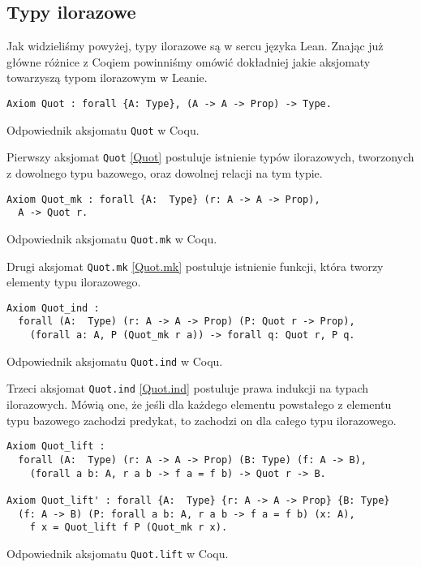 \subsection{Typy ilorazowe}
Jak widzieliśmy powyżej, typy ilorazowe są w sercu języka Lean. Znając już główne różnice z Coqiem powinniśmy omówić dokładniej jakie aksjomaty towarzyszą typom ilorazowym w Leanie. 
\begin{code}
\begin{verbatim}
Axiom Quot : forall {A: Type}, (A -> A -> Prop) -> Type.
\end{verbatim}
\caption{Odpowiednik aksjomatu \texttt{Quot} w Coqu.}
\label{Quot}
\end{code}

Pierwszy aksjomat \texttt{Quot} \ref{Quot} postuluje istnienie typów ilorazowych, tworzonych z dowolnego typu bazowego, oraz dowolnej relacji na tym typie.
\begin{code}
\begin{verbatim}
Axiom Quot_mk : forall {A:  Type} (r: A -> A -> Prop),
  A -> Quot r.
\end{verbatim}
\caption{Odpowiednik aksjomatu \texttt{Quot.mk} w Coqu.}
\label{Quot.mk}
\end{code}

Drugi aksjomat \texttt{Quot.mk} \ref{Quot.mk} postuluje istnienie funkcji, która tworzy elementy typu ilorazowego.
\begin{code}
\begin{verbatim}
Axiom Quot_ind : 
  forall (A:  Type) (r: A -> A -> Prop) (P: Quot r -> Prop),
    (forall a: A, P (Quot_mk r a)) -> forall q: Quot r, P q.
\end{verbatim}
\caption{Odpowiednik aksjomatu \texttt{Quot.ind} w Coqu.}
\label{Quot.ind}
\end{code}

Trzeci aksjomat \texttt{Quot.ind} \ref{Quot.ind} postuluje prawa indukcji na typach ilorazowych. Mówią one, że jeśli dla każdego elementu powstałego z elementu typu bazowego zachodzi predykat, to zachodzi on dla całego typu ilorazowego.
\begin{code}
\begin{verbatim}
Axiom Quot_lift :
  forall (A:  Type) (r: A -> A -> Prop) (B: Type) (f: A -> B),
    (forall a b: A, r a b -> f a = f b) -> Quot r -> B.

Axiom Quot_lift' : forall {A:  Type} {r: A -> A -> Prop} {B: Type} 
  (f: A -> B) (P: forall a b: A, r a b -> f a = f b) (x: A),
    f x = Quot_lift f P (Quot_mk r x).
\end{verbatim}
\caption{Odpowiednik aksjomatu \texttt{Quot.lift} w Coqu.}
\label{Quot.lift}
\end{code}

